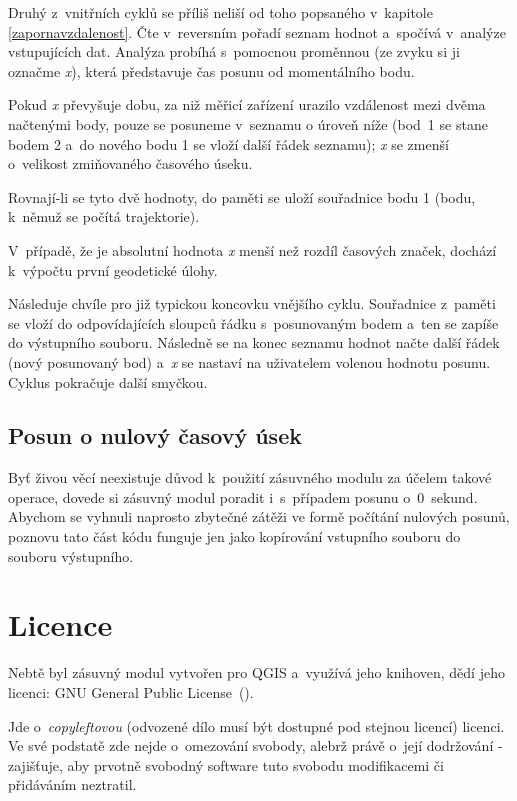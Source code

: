 Druhý z~vnitřních cyklů se příliš neliší od toho popsaného v~kapitole \ref{zapornavzdalenost}.
Čte v~reversním pořadí seznam hodnot a~spočívá v~analýze vstupujících dat. Analýza
probíhá s~pomocnou proměnnou (ze zvyku si ji označme
\textit{x}), která představuje čas posunu od momentálního bodu. 

Pokud \textit{x} převyšuje dobu, za niž měřicí zařízení urazilo vzdálenost mezi dvěma načtenými
body, pouze se posuneme v~seznamu o úroveň níže (bod~1 se stane bodem 2 a~do nového
bodu 1 se vloží další řádek seznamu); \textit{x} se zmenší o~velikost zmiňovaného časového úseku. 

Rovnají-li se tyto dvě hodnoty, do paměti se uloží
souřadnice bodu 1 (bodu, k~němuž se počítá trajektorie). 

V~případě, že je absolutní hodnota \textit{x} menší než rozdíl časových značek, dochází
k~výpočtu první geodetické úlohy. 

Následuje chvíle pro již typickou koncovku vnějšího cyklu. Souřadnice z~paměti se vloží
do odpovídajících sloupců řádku s~posunovaným bodem a~ten se zapíše do výstupního souboru.
Následně se na konec seznamu hodnot načte další řádek (nový posunovaný bod) a~\textit{x}
se nastaví na uživatelem volenou hodnotu posunu. Cyklus pokračuje další smyčkou. 

\subsection{Posun o nulový časový úsek}
\label{nulovycas}

Byť živou věcí neexistuje důvod k~použití zásuvného modulu za účelem takové ope\-race,
dovede si zásuvný modul poradit i~s~případem posunu o~0~sekund. Abychom se vyhnuli
naprosto zbytečné zátěži ve formě počítání nulových posunů, poznovu tato část kódu
funguje jen jako kopírování vstupního souboru do souboru výstupního. 

\section{Licence}
\label{licence}

Nebtě byl zásuvný modul vytvořen pro QGIS a~využívá jeho knihoven, dědí jeho licenci: GNU General Public
License~(). 

Jde o~\textit{copyleftovou} (odvozené dílo musí být dostupné pod stejnou licencí)
licenci. Ve své podstatě zde nejde o~omezování svobody, alebrž právě o~její dodržování - zajišťuje,
aby prvotně svobodný software tuto svobodu modifikacemi či přidáváním neztratil. 



